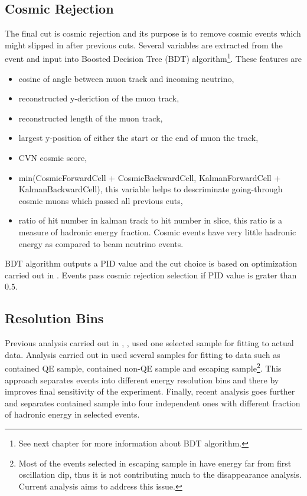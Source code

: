 \subsection{Cosmic Rejection}
The final cut is cosmic rejection and its purpose is to remove cosmic events which might slipped in after
previous cuts. Several variables are extracted from the event and input into Boosted Decision Tree (BDT)
algorithm\footnote{See next chapter for more information about BDT algorithm.}\cite{cosrej_technote}. 
These features are
\begin{itemize}
\item cosine of angle between muon track and incoming neutrino,
\item reconstructed y-deriction of the muon track,
\item reconstructed length of the muon track,
\item largest y-position of either the start or the end of muon the track,
\item CVN cosmic score,
\item min(CosmicForwardCell + CosmicBackwardCell, KalmanForwardCell + KalmanBackwardCell), this 
variable helps to descriminate going-through cosmic muons which passed all previous cuts,
\item ratio of hit number in kalman track to hit number in slice, this ratio is a measure of hadronic
energy fraction. Cosmic events have very little hadronic energy as compared to beam neutrino events. 
\end{itemize}
BDT algorithm outputs a PID value and the cut choice is based on optimization carried out in 
\cite{numupid_technote}. Events pass cosmic rejection selection if PID value is grater than $0.5$.

\subsection{Resolution Bins}
Previous analysis carried out in \cite{Kanika}, \cite{Dominick}, \cite{Susan} used one selected sample for 
fitting to actual data. Analysis carried out in \cite{Nick} used several samples for fitting to data 
such as contained QE sample, contained non-QE sample and escaping sample\footnote{Most of the events 
selected in escaping sample in \cite{Nick} have energy far from first oscillation dip, thus it is not 
contributing much to the disappearance analysis. Current analysis aims to address this issue.}. This 
approach separates events into different energy resolution bins and there by improves final sensitivity 
of the experiment. Finally, recent analysis \cite{Luke} goes further and separates contained sample into 
four independent ones with different fraction of hadronic energy in selected events. 

